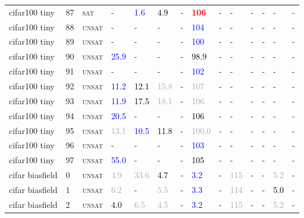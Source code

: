 \begin{center}
{\begin{longtable}{@{}llllllllllllll@{}}
cifar100 tiny & 87 & \textsc{sat} & - & \textcolor{blue}{1.6} & \textcolor{black}{4.9} & - & \textbf{\textcolor{red}{106}} & - & - & - & - & - & - \\
cifar100 tiny & 88 & \textsc{unsat} & - & - & - & - & \textcolor{blue}{104} & - & - & - & - & - & - \\
cifar100 tiny & 89 & \textsc{unsat} & - & - & - & - & \textcolor{blue}{100} & - & - & - & - & - & - \\
cifar100 tiny & 90 & \textsc{unsat} & \textcolor{blue}{25.9} & - & - & - & \textcolor{black}{98.9} & - & - & - & - & - & - \\
cifar100 tiny & 91 & \textsc{unsat} & - & - & - & - & \textcolor{blue}{102} & - & - & - & - & - & - \\
cifar100 tiny & 92 & \textsc{unsat} & \textcolor{blue}{11.2} & \textcolor{black}{12.1} & \textcolor{darkgray}{15.8} & - & \textcolor{darkgray}{107} & - & - & - & - & - & - \\
cifar100 tiny & 93 & \textsc{unsat} & \textcolor{blue}{11.9} & \textcolor{black}{17.5} & \textcolor{darkgray}{18.1} & - & \textcolor{darkgray}{106} & - & - & - & - & - & - \\
cifar100 tiny & 94 & \textsc{unsat} & \textcolor{blue}{20.5} & - & - & - & \textcolor{black}{106} & - & - & - & - & - & - \\
cifar100 tiny & 95 & \textsc{unsat} & \textcolor{darkgray}{13.1} & \textcolor{blue}{10.5} & \textcolor{black}{11.8} & - & \textcolor{darkgray}{100.0} & - & - & - & - & - & - \\
cifar100 tiny & 96 & \textsc{unsat} & - & - & - & - & \textcolor{blue}{103} & - & - & - & - & - & - \\
cifar100 tiny & 97 & \textsc{unsat} & \textcolor{blue}{55.0} & - & - & - & \textcolor{black}{105} & - & - & - & - & - & - \\
cifar biasfield & 0 & \textsc{unsat} & \textcolor{darkgray}{4.9} & \textcolor{darkgray}{33.6} & \textcolor{black}{4.7} & - & \textcolor{blue}{3.2} & - & \textcolor{darkgray}{115} & - & - & \textcolor{darkgray}{5.2} & - \\
cifar biasfield & 1 & \textsc{unsat} & \textcolor{darkgray}{6.2} & - & \textcolor{darkgray}{5.5} & - & \textcolor{blue}{3.3} & - & \textcolor{darkgray}{114} & - & - & \textcolor{black}{5.0} & - \\
cifar biasfield & 2 & \textsc{unsat} & \textcolor{black}{4.0} & \textcolor{darkgray}{6.5} & \textcolor{darkgray}{4.5} & - & \textcolor{blue}{3.2} & - & \textcolor{darkgray}{115} & - & - & \textcolor{darkgray}{5.2} & - \\

\end{longtable}}
\end{center}
